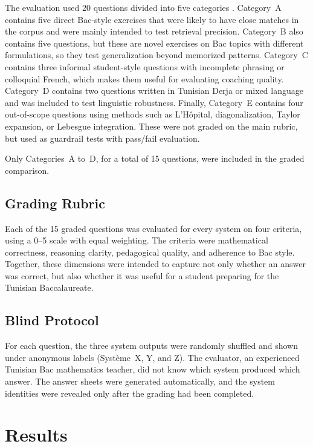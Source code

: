 The evaluation used 20 questions divided into five categories . Category~A contains five
direct Bac-style exercises that were likely to have close matches in the
corpus and were mainly intended to test retrieval precision. Category~B also
contains five questions, but these are novel exercises on Bac topics with
different formulations, so they test generalization beyond memorized
patterns. Category~C contains three informal student-style questions with
incomplete phrasing or colloquial French, which makes them useful for
evaluating coaching quality. Category~D contains two questions written in
Tunisian Derja or mixed language and was included to test linguistic
robustness. Finally, Category~E contains four out-of-scope questions using
methods such as L'H\^opital, diagonalization, Taylor expansion, or Lebesgue
integration. These were not graded on the main rubric, but used as guardrail
tests with pass/fail evaluation.

Only Categories~A to~D, for a total of 15 questions, were included in the
graded comparison.

\subsection{Grading Rubric}

Each of the 15 graded questions was evaluated for every system on four
criteria, using a 0--5 scale with equal weighting. The criteria were
mathematical correctness, reasoning clarity, pedagogical quality, and
adherence to Bac style. Together, these dimensions were intended to capture
not only whether an answer was correct, but also whether it was useful for a
student preparing for the Tunisian Baccalaureate.

\subsection{Blind Protocol}
\label{subsec:blind-evaluation}

For each question, the three system outputs were randomly shuffled and shown
under anonymous labels (Syst\`{e}me~X, Y, and Z). The evaluator, an
experienced Tunisian Bac mathematics teacher, did not know which system
produced which answer. The answer sheets were generated automatically, and
the system identities were revealed only after the grading had been
completed.

\section{Results}
\label{subsec:results}

